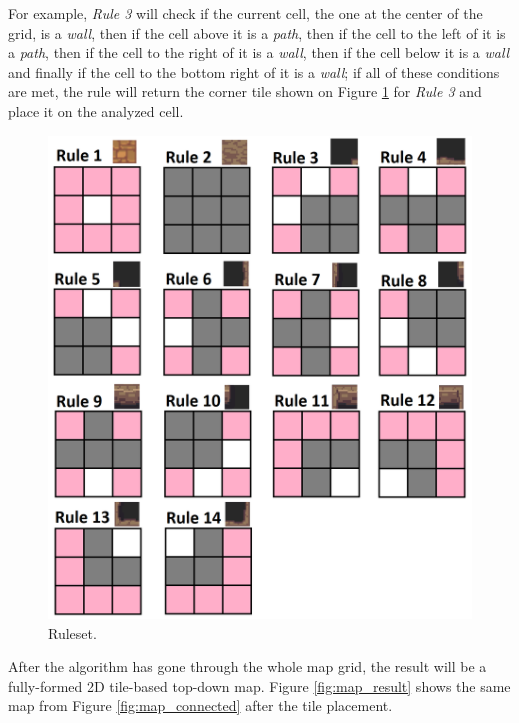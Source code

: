 For example, \emph{Rule 3} will check if the current cell, the one at the center of the grid, is a \emph{wall}, then if the cell above it is a \emph{path}, then if the cell to the left of it is a \emph{path}, then if the cell to the right of it is a \emph{wall}, then if the cell below it is a \emph{wall} and finally if the cell to the bottom right of it is a \emph{wall}; if all of these conditions are met, the rule will return the corner tile shown on Figure \ref{fig:ruleset} for \emph{Rule 3} and place it on the analyzed cell.

\begin{figure}[h]
    \caption{Ruleset.}
    \centerline{\includegraphics[width=12cm]{images/development/morph_rules.png}}
    \label{fig:ruleset}
\end{figure}

After the algorithm has gone through the whole map grid, the result will be a fully-formed 2D tile-based top-down map. Figure \ref{fig:map_result} shows the same map from Figure \ref{fig:map_connected} after the tile placement.

